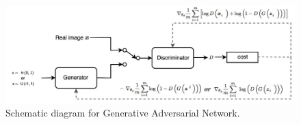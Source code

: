 \begin{figure}
	\begin{adjustbox}{width=\textwidth}






		\includegraphics[]{figures/neural_networks/gan.jpeg}
	\end{adjustbox}
	\caption{Schematic diagram for Generative Adversarial Network\cite{ponti2017}.}\label{fig:gan}

\end{figure}
